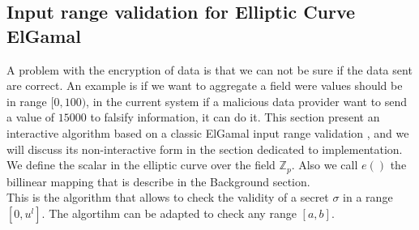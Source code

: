 \documentclass{article}
\begin{document}
\subsection{Input range validation for Elliptic Curve ElGamal}

A problem with the encryption of data is that we can not be sure if the data sent are correct. An example is if we want to aggregate a field were values should be in range $[0,100)$, in the current system if a malicious data provider want to send a value of $15000$ to falsify information, it can do it. This section present an  interactive algorithm based on a classic ElGamal input range validation \cite{range}, and we will discuss its non-interactive form in the section dedicated to implementation.\\
We define the scalar in the elliptic curve over the field $\mathbb{Z}_p$. Also we call $e()$ the billinear mapping that is describe in the Background section.\\
This is the algorithm that allows to check the validity of a secret $\sigma$ in a range $ [0,u^l]$. The algortihm can be adapted to check any range $[a,b]$.\\
\end{document}
